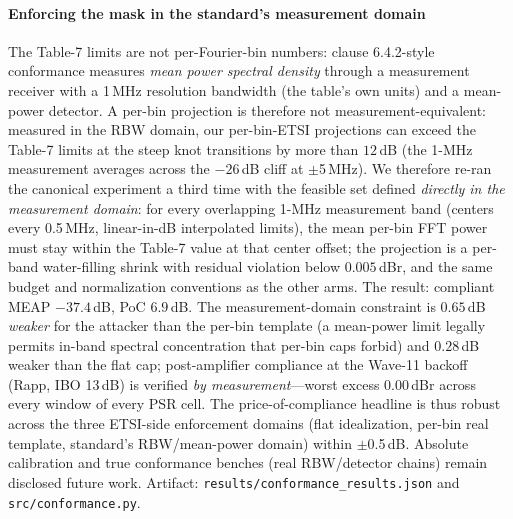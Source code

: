 \documentclass[review]{elsarticle}
\begin{document}
\paragraph{Enforcing the mask in the standard's measurement domain}
\label{sec:conformance}
The Table-7 limits are not per-Fourier-bin numbers: clause 6.4.2-style
conformance measures \emph{mean power spectral density} through a
measurement receiver with a 1\,MHz resolution bandwidth (the table's own
units) and a mean-power detector. A per-bin projection is therefore not
measurement-equivalent: measured in the RBW domain, our per-bin-ETSI
projections can exceed the Table-7 limits at the steep knot transitions by
more than $12$\,dB (the 1-MHz measurement averages across the $-26$\,dB
cliff at $\pm$5\,MHz). We therefore re-ran the canonical experiment a third
time with the feasible set defined \emph{directly in the measurement
domain}: for every overlapping 1-MHz measurement band (centers every
0.5\,MHz, linear-in-dB interpolated limits), the mean per-bin FFT power
must stay within the Table-7 value at that center offset; the projection is
a per-band water-filling shrink with residual violation below
$0.005$\,dBr, and the same budget and normalization conventions as the
other arms. The result: compliant MEAP $-37.4$\,dB, PoC $6.9$\,dB. The
measurement-domain constraint is $0.65$\,dB \emph{weaker} for the attacker
than the per-bin template (a mean-power limit legally permits in-band
spectral concentration that per-bin caps forbid) and $0.28$\,dB weaker than
the flat cap; post-amplifier compliance at the Wave-11 backoff (Rapp,
IBO 13\,dB) is verified \emph{by measurement}---worst excess $0.00$\,dBr
across every window of every PSR cell. The price-of-compliance headline is
thus robust across the three ETSI-side enforcement domains (flat
idealization, per-bin real template, standard's RBW/mean-power domain)
within $\pm$0.5\,dB. Absolute calibration and true conformance
benches (real RBW/detector chains) remain disclosed future work.
Artifact: \texttt{results/conformance\_results.json} and
\texttt{src/conformance.py}.
\end{document}
